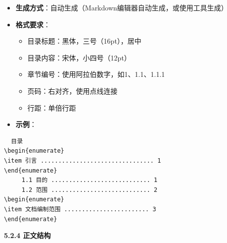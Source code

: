 \documentclass[12pt,a4paper]{article}
\numberwithin{equation}{section}  %
\begin{document}
\begin{itemize}
\item \textbf{生成方式}：自动生成（Markdown编辑器自动生成，或使用工具生成）
\item \textbf{格式要求}：
\begin{itemize}
\item 目录标题：黑体，三号（16pt），居中
\item 目录内容：宋体，小四号（12pt）
\item 章节编号：使用阿拉伯数字，如1、1.1、1.1.1
\item 页码：右对齐，使用点线连接
\item 行距：单倍行距
\end{itemize}
\item \textbf{示例}：
\end{itemize}
  \begin{verbatim}
  目录
\begin{enumerate}
\item 引言 ................................ 1
\end{enumerate}
     1.1 目的 ............................ 1
     1.2 范围 ............................ 2
\begin{enumerate}
\item 文档编制范围 ........................ 3
\end{enumerate}
  \end{verbatim}

\textbf{5.2.4 正文结构}
\end{document}
